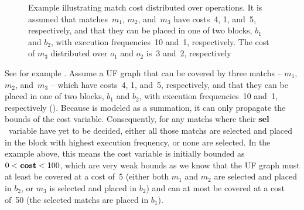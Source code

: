 \begin{figure}
  \caption[Example illustrating match cost distributed over operations]%
          {%
            Example illustrating match cost distributed over operations.
            It is assumed that matches~$m_1$, $m_2$, and~$m_3$ have costs~4,
            1, and~5, respectively, and that they can be placed in one of two
            blocks, $b_1$ and $b_2$, with execution frequencies~10 and~1,
            respectively.
            The cost of $m_3$ distributed over $o_1$ and $o_2$ is~3 and~2,
            respectively%
          }
\end{figure}
%
See for example .
%
Assume a \gls{UF graph} that can be covered by three \glspl{match} -- $m_1$,
$m_2$, and~$m_3$ -- which have costs~4, 1, and~5, respectively, and that they
can be placed in one of two blocks, $b_1$ and $b_2$, with execution
frequencies~10 and~1, respectively ().
%
Because  is modeled as a summation, it can
only propagate the bounds of the \gls{cost variable}.
%
Consequently, for any \glspl{match} where their $\mVar{sel}$~\gls{variable} have
yet to be decided, either all those \glspl{match} are selected and placed in the
\gls{block} with highest execution frequency, or none are selected.
%
In the example above, this means the \gls{cost variable} is initially bounded as
\mbox{$0 < \mVar{cost} < 100$}, which are very weak bounds as we know that the
\gls{UF graph} must at least be covered at a cost of~5 (either both $m_1$ and
$m_2$ are selected and placed in $b_2$, or $m_3$ is selected and placed in
$b_2$) and can at most be covered at a cost of~50 (the selected \glspl{match}
are placed in $b_1$).

